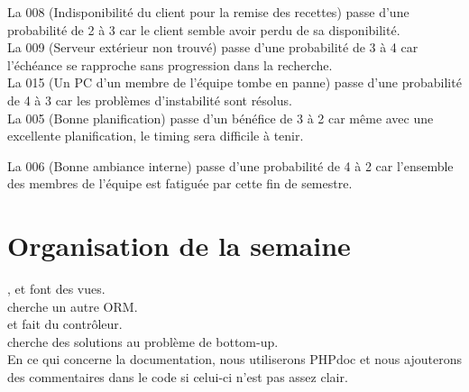 \documentclass [a4paper] {article}
\begin{document}
La \FDR{} 008 (Indisponibilité du client pour la remise des recettes) passe d'une probabilité de 2 à 3 car le client semble avoir perdu de sa disponibilité.\\

La \FDR{} 009 (Serveur extérieur non trouvé) passe d'une probabilité de 3 à 4 car l'échéance se rapproche sans progression dans la recherche.\\

La \FDR{} 015 (Un PC d’un membre de l’équipe tombe en panne) passe d'une probabilité de 4 à 3 car les problèmes d'instabilité sont résolus.\\

La \FDO{} 005 (Bonne planification) passe d'un bénéfice de 3 à 2 car même avec une excellente planification, le timing sera difficile à tenir.

La \FDO{} 006 (Bonne ambiance interne) passe d'une probabilité de 4 à 2 car l'ensemble des membres de l'équipe est fatiguée par cette fin de semestre.



\section{Organisation de la semaine}
\Matthieu, \Julie{} et \Mathieu{} font des vues.\\
\Melissa{} cherche un autre ORM.\\
\Florian{} et \Kafui{} fait du contrôleur.\\
\Michel cherche des solutions au problème de bottom-up.\\

En ce qui concerne la documentation, nous utiliserons PHPdoc et nous ajouterons des commentaires dans le code si celui-ci n'est pas assez clair.



\end{document}
